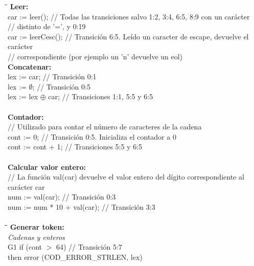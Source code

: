 \begin{tabbing}
    \hspace{1cm}\=\hspace{5cm}\=\kill
    \textbf{Leer:} \\
    \> car := leer(); \> // Todas las transiciones salvo 1:2, 3:4, 6:5, 8:9 con un carácter\\
    \> \hspace{5cm}// distinto de '=', y 0:19\\
    \> car := leerCesc(); \> // Transición 6:5. Leído un caracter de escape, devuelve el carácter\\
    \> \hspace{5cm}// correspondiente (por ejemplo un 'n' devuelve un eol)
    \\
    \textbf{Concatenar:} \\
    \> lex := car; \> // Transición 0:1 \\
    \> lex := $\emptyset$; \> // Transición 0:5 \\
    \> lex := lex $\oplus$  car; \> // Transiciones 1:1, 5:5 y 6:5\\
    \\
    \textbf{Contador:} \\
    \> // Utilizado para contar el número de caracteres de la cadena \\
    \> cont := 0; \> // Transición 0:5. Inicializa el contador a 0\\
    \> cont := cont + 1; \> // Transiciones 5:5 y 6:5 \\
    \\
    \textbf{Calcular valor entero:} \\
    \> // La función val(car) devuelve el valor entero del dígito correspondiente al carácter car\\
    \> num := val(car); \> // Transición 0:3 \\
    \> num := num * 10 + val(car); \> // Transición 3:3 \\
    \\
    \hspace{1cm}\=\hspace{1cm}\=\hspace{7cm}\=\kill %
    \textbf{Generar token:} \\
    \textit{Cadenas y enteros} \\
    \> G1 \> if (cont $>$ 64) \> // Transición 5:7 \\
    \> \hspace{1.5cm} then error (COD\_ERROR\_STRLEN, lex) \\

\end{tabbing}
